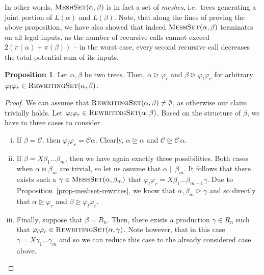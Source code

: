 \documentclass[11pt,a4paper]{amsart}
\theoremstyle{definition}
\newtheorem{prop}[theorem]{Proposition}
\newcommand{\RewritingSet}[2]{\textsc{RewritingSet}(#1,#2)}
\newcommand{\MeshSet}[2]{\textsc{MeshSet}(#1,#2)}
\newcommand{\potential}[1]{\pi(#1)}
\begin{document}
In other words, $\MeshSet{\alpha}{\beta}$ is in fact a set of \emph{meshes}, i.e.~trees generating a joint portion of $L(\alpha)$ and $L(\beta)$. Note, that along the lines of proving the above proposition, we have also showed that indeed $\MeshSet{\alpha}{\beta}$ terminates on all legal inputs, as the number of recursive calls cannot exceed $2 (\potential{\alpha} + \potential{\beta})$ -- in the worst case, every second recursive call decreases the total potential sum of its inputs.

\begin{prop}\label{prop-rewritingset-rewrites}
    Let $\alpha,\beta$ be two trees. Then, $\alpha \trianglerighteq
    \varphi_r$ and $\beta \trianglerighteq \varphi_l \varphi_r$ for arbitrary
    $\varphi_l \varphi_r \in \RewritingSet{\alpha}{\beta}$.
\end{prop}

\begin{proof}
    We can assume that $\RewritingSet{\alpha}{\beta} \neq \emptyset$, as otherwise our claim trivially holds.
    Let $\varphi_l \varphi_r \in \RewritingSet{\alpha}{\beta}$. Based on the structure of $\beta$, we have to three cases to consider.
    \begin{enumerate}[(i)]
        \item If $\beta = \mathcal{C}$, then $\varphi_l \varphi_r = \mathcal{C}
                \alpha$. Clearly, $\alpha \trianglerighteq
                    \alpha$ and $\mathcal{C} \trianglerighteq \mathcal{C}\,
                    \alpha$.
        \item If $\beta = X \beta_1 \ldots \beta_m$, then we have again exactly three possibilities. Both cases when $\alpha \bowtie \beta_m$ are
                trivial, so let us assume that $\alpha \parallel \beta_m$. It
                follows that there exists such a $\gamma \in
                \MeshSet{\alpha}{\beta_m}$ that $\varphi_l \varphi_r = X \beta_1
                \ldots \beta_{m-1} \gamma$. Due to
                Proposition~\ref{prop-meshset-rewrites}, we know that
                $\alpha,\beta_m \trianglerighteq \gamma$ and so directly that
                $\alpha \trianglerighteq \varphi_r$ and 
                $\beta \trianglerighteq \varphi_l \varphi_r$.
        \item Finally, suppose that $\beta = R_n$. Then, there exists a production $\gamma \in
                R_n$ such that $\varphi_l \varphi_r \in \RewritingSet{\alpha}{\gamma}$.
                Note however, that in this case $\gamma = X \gamma_1 \ldots
                \gamma_m$ and so we can reduce this case to the already considered case above.
    \end{enumerate}
\end{proof}
\end{document}
